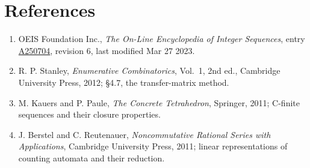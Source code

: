 \documentclass[11pt]{article}
\theoremstyle{definition}
\begin{document}
\section{References}

\begin{enumerate}

\item OEIS Foundation Inc., \emph{The On-Line Encyclopedia of Integer Sequences}, entry \href{https://oeis.org/A250704}{A250704}, revision 6, last modified Mar 27 2023.

\item R. P. Stanley, \emph{Enumerative Combinatorics}, Vol.~1, 2nd ed., Cambridge University Press, 2012; \S4.7, the transfer-matrix method.

\item M. Kauers and P. Paule, \emph{The Concrete Tetrahedron}, Springer, 2011; C-finite sequences and their closure properties.

\item J. Berstel and C. Reutenauer, \emph{Noncommutative Rational Series with Applications}, Cambridge University Press, 2011; linear representations of counting automata and their reduction.

\end{enumerate}
\end{document}
